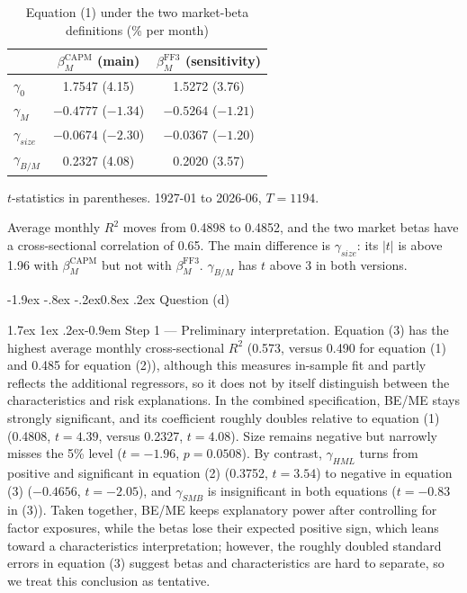 \documentclass[11pt]{article}
\makeatletter
\renewcommand\subsubsection{\@startsection{subsubsection}{3}{0pt}%
  {-1.9ex \@plus -.8ex \@minus -.2ex}{0.8ex \@plus .2ex}%
  {\normalfont\bfseries\itshape\normalsize\color{psink}}}
\renewcommand\paragraph{\@startsection{paragraph}{4}{0pt}%
  {1.7ex \@plus 1ex \@minus .2ex}{-0.9em}%
  {\normalfont\bfseries\normalsize\color{psink}}}
\makeatother
\begin{document}
\begin{table}[H]\centering\small
\caption{Equation (1) under the two market-beta definitions (\% per month)}\label{tab:sens}
\begin{tabular}{lcc}
\toprule
 & $\beta_M^{\mathrm{CAPM}}$ (main) & $\beta_M^{\mathrm{FF3}}$ (sensitivity) \\
\midrule
$\gamma_0$      & 1.7547 (4.15)       & 1.5272 (3.76)       \\
$\gamma_M$      & $-0.4777$ ($-1.34$) & $-0.5264$ ($-1.21$) \\
$\gamma_{size}$ & $-0.0674$ ($-2.30$) & $-0.0367$ ($-1.20$) \\
$\gamma_{B/M}$  & 0.2327 (4.08)       & 0.2020 (3.57)       \\
\bottomrule
\end{tabular}
\par\smallskip\footnotesize $t$-statistics in parentheses. 1927-01 to 2026-06, $T=1194$.
\end{table}

Average monthly $R^2$ moves from 0.4898 to 0.4852, and the two market betas have a
cross-sectional correlation of 0.65. The main difference is $\gamma_{size}$: its $|t|$ is
above 1.96 with $\beta_M^{\mathrm{CAPM}}$ but not with $\beta_M^{\mathrm{FF3}}$. $\gamma_{B/M}$ has $t$
above 3 in both versions.

\subsubsection{Question (d)}

\paragraph{Step 1 --- Preliminary interpretation.} Equation (3) has the highest average
monthly cross-sectional $R^2$ (0.573, versus 0.490 for equation (1) and 0.485 for
equation (2)), although this measures in-sample fit and partly reflects the additional
regressors, so it does not by itself distinguish between the characteristics and risk
explanations. In the combined specification, BE/ME stays strongly significant, and its
coefficient roughly doubles relative to equation (1) (0.4808, $t = 4.39$, versus 0.2327,
$t = 4.08$). Size remains negative but narrowly misses the 5\% level ($t = -1.96$,
$p = 0.0508$). By contrast, $\gamma_{HML}$ turns from positive and significant in
equation (2) (0.3752, $t = 3.54$) to negative in equation (3) ($-0.4656$, $t = -2.05$),
and $\gamma_{SMB}$ is insignificant in both equations ($t = -0.83$ in (3)). Taken
together, BE/ME keeps explanatory power after controlling for factor exposures, while the
betas lose their expected positive sign, which leans toward a characteristics
interpretation; however, the roughly doubled standard errors in equation (3) suggest
betas and characteristics are hard to separate, so we treat this conclusion as tentative.
\end{document}
